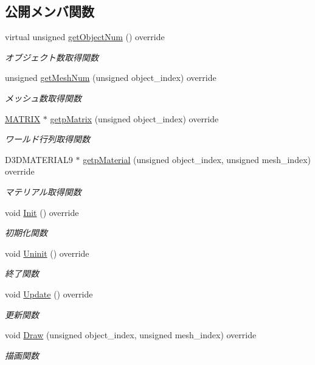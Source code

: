 \subsection*{公開メンバ関数}
\begin{DoxyCompactItemize}
\item 
virtual unsigned \mbox{\hyperlink{class_balloon_draw_a979518a6cc85aa355f680336953b5e46}{get\+Object\+Num}} () override
\begin{DoxyCompactList}\small\item\em オブジェクト数取得関数 \end{DoxyCompactList}\item 
unsigned \mbox{\hyperlink{class_balloon_draw_ab6d1aa381df255809889d9f646154dc5}{get\+Mesh\+Num}} (unsigned object\+\_\+index) override
\begin{DoxyCompactList}\small\item\em メッシュ数取得関数 \end{DoxyCompactList}\item 
\mbox{\hyperlink{_matrix_8h_a032295cd9fb1b711757c90667278e744}{M\+A\+T\+R\+IX}} $\ast$ \mbox{\hyperlink{class_balloon_draw_ab98a9333dcdf57c0ede287444b7cbabb}{getp\+Matrix}} (unsigned object\+\_\+index) override
\begin{DoxyCompactList}\small\item\em ワールド行列取得関数 \end{DoxyCompactList}\item 
D3\+D\+M\+A\+T\+E\+R\+I\+A\+L9 $\ast$ \mbox{\hyperlink{class_balloon_draw_aa84c8479ee1a6e95376b7fc0c82e5173}{getp\+Material}} (unsigned object\+\_\+index, unsigned mesh\+\_\+index) override
\begin{DoxyCompactList}\small\item\em マテリアル取得関数 \end{DoxyCompactList}\item 
void \mbox{\hyperlink{class_balloon_draw_ad00ffd9c5316e08938259e1f1116812f}{Init}} () override
\begin{DoxyCompactList}\small\item\em 初期化関数 \end{DoxyCompactList}\item 
void \mbox{\hyperlink{class_balloon_draw_a9c38865af6eb74b163fcdd6204c42e3e}{Uninit}} () override
\begin{DoxyCompactList}\small\item\em 終了関数 \end{DoxyCompactList}\item 
void \mbox{\hyperlink{class_balloon_draw_a9314af6e3458e87fcace44a11e33126f}{Update}} () override
\begin{DoxyCompactList}\small\item\em 更新関数 \end{DoxyCompactList}\item 
void \mbox{\hyperlink{class_balloon_draw_aff3ee0684a7c027878915e332ca895ee}{Draw}} (unsigned object\+\_\+index, unsigned mesh\+\_\+index) override
\begin{DoxyCompactList}\small\item\em 描画関数 \end{DoxyCompactList}\end{DoxyCompactItemize}
